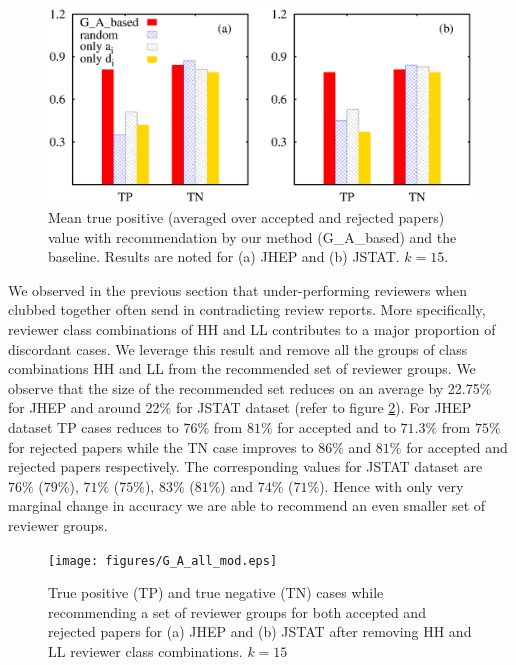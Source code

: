 \begin{figure}
\centering
\includegraphics[scale = 0.35]{./texfiles/Chapter_4/cikm_17/figures/G_A_baseline.eps}
\caption{\label{fig:GA_base} Mean true positive (averaged over accepted and rejected papers) value with recommendation by our method (G\_A\_based) and the baseline. Results are 
noted for (a) JHEP and (b) JSTAT. $k = 15$.}
\end{figure}

 We observed in the previous section that under-performing reviewers when clubbed together often send in contradicting review reports. More specifically, 
reviewer class combinations of HH and LL contributes to a major proportion of discordant cases. We leverage this result and remove all the groups of class 
combinations HH and LL from the recommended set of reviewer groups. We observe that the size of the recommended set reduces on an average by 22.75\% for 
JHEP and around 22\% for JSTAT dataset (refer to figure \ref{fig:G_A_mod}). For JHEP dataset TP cases reduces to $76\%$ from $81\%$ for accepted and to $71.3\%$ 
from $75\%$ for rejected papers while the TN case improves to $86\%$ and $81\%$ for accepted and rejected papers respectively. The corresponding values for 
JSTAT dataset are $76\%$ ($79\%$), $71\%$ ($75\%$), $83\%$ ($81\%$) and $74\%$ ($71\%$). Hence with only very marginal change in accuracy we are able to recommend 
an even smaller set of reviewer groups. 

\begin{figure}
\texttt{[image: figures/G\_A\_all\_mod.eps]}
\caption{\label{fig:G_A_mod} True positive (TP) and true negative (TN) cases while recommending a set of reviewer groups for both accepted and rejected papers 
for (a) JHEP and (b) JSTAT after removing HH and LL reviewer class combinations. $k = 15$}
\end{figure}
\fi

\medskip
